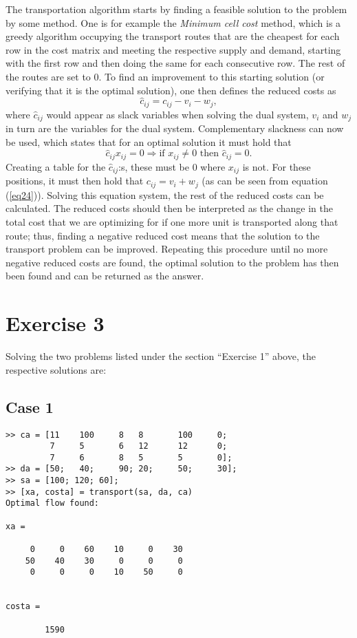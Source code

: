 \documentclass{article}
\begin{document}
  \noindent
  The transportation algorithm starts by finding a feasible solution to the problem by some method. One is for example the \textit{Minimum cell cost} method, which is a greedy algorithm occupying the transport routes that are the cheapest for each row in the cost matrix and meeting the respective supply and demand, starting with the first row and then doing the same for each consecutive row. The rest of the routes are set to 0.
  To find an improvement to this starting solution (or verifying that it is the optimal solution), one then defines the reduced costs as
  \begin{equation}
    \hat{c}_{ij} = c_{ij} - v_i - w_j,
    \label{eq24}
  \end{equation}
  where $\hat{c}_{ij}$ would appear as slack variables when solving the dual system, $v_i$ and $w_j$ in turn are the variables for the dual system. Complementary slackness can now be used, which states that for an optimal solution it must hold that
  \begin{equation}
    \hat{c}_{ij}x_{ij} = 0 \Rightarrow \text{if } x_{ij} \neq 0 \text{ then } \hat{c}_{ij} = 0.
  \end{equation}
  Creating a table for the $\hat{c}_{ij}$:s, these must be 0 where $x_{ij}$ is not. For these positions, it must then hold that $c_{ij} = v_i + w_j$ (as can be seen from equation (\ref{eq24})). Solving this equation system, the rest of the reduced costs can be calculated. The reduced costs should then be interpreted as the change in the total cost that we are optimizing for if one more unit is transported along that route; thus, finding a negative reduced cost means that the solution to the transport problem can be improved. Repeating this procedure until no more negative reduced costs are found, the optimal solution to the problem has then been found and can be returned as the answer.

  \section*{Exercise 3}
  Solving the two problems listed under the section ``Exercise 1'' above, the respective solutions are:

  \subsection*{Case 1}
  \begin{lstlisting}
>> ca = [11    100     8   8       100     0; 
         7     5       6   12      12      0; 
         7     6       8   5       5       0];
>> da = [50;   40;     90; 20;     50;     30];
>> sa = [100; 120; 60];
>> [xa, costa] = transport(sa, da, ca)
Optimal flow found:

xa =

     0     0    60    10     0    30
    50    40    30     0     0     0
     0     0     0    10    50     0


costa =

        1590
  \end{lstlisting}
\end{document}
